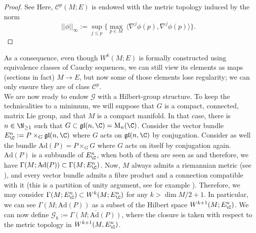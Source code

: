 \begin{proof}
    See \parencite[Th. B.2]{wehrheim2004uhlenbeck} Here, \(\mathscr{C}^p(M;E)\) is endowed with the metric topology induced by the norm 
    \[
    ||\phi||_\infty:=\sup_{j \leq p} \big\{ \max_{p \in M}\ \langle \nabla^j \phi(p), \nabla^j \phi(p)\rangle \big\}. 
    \]
\end{proof}
As a consequence, even though \(W^k(M;E)\) is formally constructed using equivalence classes of Cauchy sequences, we can still view its elements as maps (sections in fact) \(M \to E\), but now some of those elements lose regularity; we can only ensure they are of class \(\mathscr{C}^p\). \\

We are now ready to endow \(\mathcal{G}\) with a Hilbert-group structure. To keep the technicalities to a minimum, we will suppose that \(G\) is a compact, connected, matrix Lie group, and that \(M\) is a compact manifold. In that case, there is \(n \in \N_{\geq 1}\) such that \(G \subset \mathfrak{gl}(n, \C)=\mathrm{M}_n(\C)\). Consider the vector bundle \(E^n_\C:=P \times_G \mathfrak{gl}(n, \C)\) where \(G\) acts on \(\mathfrak{gl}(n, \C)\) by conjugation. Consider as well the bundle \(\mathrm{Ad}(P)=P \times_G G\) where \(G\) acts on itself by conjugation again. \(\mathrm{Ad}(P)\) is a subbundle of \(E_\C^n\), when both of them are seen as and therefore, we have \(\Gamma(M; \mathrm{Ad}(P)) \subset \Gamma(M; E_\C^n)\). Now, \(M\) always admits a riemannian metric (see \parencite[Prop. 13.3]{lee_introSM}), and  every vector bundle admits a fibre product and a connection compatible with it (this is a partition of unity argument, see for example \parencite[Page 196]{lee_introCM}). Therefore, we may consider \(\Gamma(M; E_{\C}^n) \subset W^k(M; E_\C^n)\) for any \(k > \dim M/2+1\). In particular, we can see \(\Gamma(M; \mathrm{Ad}(P))\) as a subset of the Hilbert space \(W^{k+1}(M; E_\C^n)\). We can now define \(\mathscr{G}_k:=\overline{\Gamma(M; \mathrm{Ad}(P))}\), where the closure is taken with respect to the metric topology in \(W^{k+1}(M, E_\C^n)\). 


